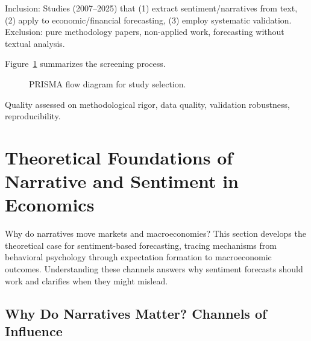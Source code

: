 \documentclass[11pt]{article}
\begin{document}
Inclusion: Studies (2007--2025) that (1) extract sentiment/narratives from text, (2) apply to economic/financial forecasting, (3) employ systematic validation. Exclusion: pure methodology papers, non-applied work, forecasting without textual analysis.

Figure~\ref{fig:prisma} summarizes the screening process.

\begin{figure}[htbp]
\centering
\caption{PRISMA flow diagram for study selection.}
\label{fig:prisma}
\small
{}
\end{figure}

Quality assessed on methodological rigor, data quality, validation robustness, reproducibility.

\section{Theoretical Foundations of Narrative and Sentiment in Economics}

Why do narratives move markets and macroeconomies? This section develops the theoretical case for sentiment-based forecasting, tracing mechanisms from behavioral psychology through expectation formation to macroeconomic outcomes. Understanding these channels answers why sentiment forecasts should work and clarifies when they might mislead.

\subsection{Why Do Narratives Matter? Channels of Influence}
\end{document}
